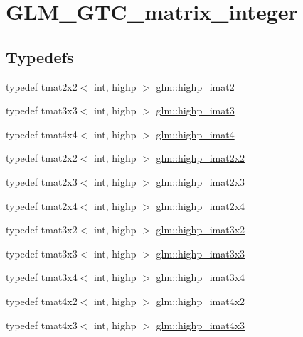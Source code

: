 \hypertarget{group__gtc__matrix__integer}{}\section{G\+L\+M\+\_\+\+G\+T\+C\+\_\+matrix\+\_\+integer}
\label{group__gtc__matrix__integer}
\subsection*{Typedefs}
\begin{DoxyCompactItemize}
\item 
typedef tmat2x2$<$ int, highp $>$ \hyperlink{group__gtc__matrix__integer_gae1cd6ff099593d2f215bd4ceed538200}{glm\+::highp\+\_\+imat2}
\item 
typedef tmat3x3$<$ int, highp $>$ \hyperlink{group__gtc__matrix__integer_ga0766d11d0154f42893ef0912ab7c6a2c}{glm\+::highp\+\_\+imat3}
\item 
typedef tmat4x4$<$ int, highp $>$ \hyperlink{group__gtc__matrix__integer_gaa5eedcb20883541c3f7f2862cbd0b446}{glm\+::highp\+\_\+imat4}
\item 
typedef tmat2x2$<$ int, highp $>$ \hyperlink{group__gtc__matrix__integer_gab4411f2d106d24a32aaa3cb711dc8510}{glm\+::highp\+\_\+imat2x2}
\item 
typedef tmat2x3$<$ int, highp $>$ \hyperlink{group__gtc__matrix__integer_ga6c1a5f4d85de3f7eccb394970320bafc}{glm\+::highp\+\_\+imat2x3}
\item 
typedef tmat2x4$<$ int, highp $>$ \hyperlink{group__gtc__matrix__integer_gae7502957eb2ab9268726d87389ae2b55}{glm\+::highp\+\_\+imat2x4}
\item 
typedef tmat3x2$<$ int, highp $>$ \hyperlink{group__gtc__matrix__integer_ga2c8dc817124f44bc01f27777bfce983b}{glm\+::highp\+\_\+imat3x2}
\item 
typedef tmat3x3$<$ int, highp $>$ \hyperlink{group__gtc__matrix__integer_gaecb62c11fb25aadbb7eecc2da226d444}{glm\+::highp\+\_\+imat3x3}
\item 
typedef tmat3x4$<$ int, highp $>$ \hyperlink{group__gtc__matrix__integer_gabcd2d8d764b11db413259ee5cafd8446}{glm\+::highp\+\_\+imat3x4}
\item 
typedef tmat4x2$<$ int, highp $>$ \hyperlink{group__gtc__matrix__integer_ga7b936ac315e12b546d2597a4bffee4a1}{glm\+::highp\+\_\+imat4x2}
\item 
typedef tmat4x3$<$ int, highp $>$ \hyperlink{group__gtc__matrix__integer_ga28e21d3fe05d8476402e27081150cade}{glm\+::highp\+\_\+imat4x3}

\end{DoxyCompactItemize}
